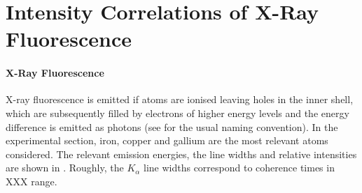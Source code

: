 


\section{Intensity Correlations of X-Ray Fluorescence}
\paragraph{X-Ray Fluorescence}
 X-ray fluorescence is emitted if atoms are ionised leaving holes in the inner shell, which are subsequently filled by electrons of higher energy levels and the energy difference is emitted as photons (see  for the usual naming convention). In the experimental section, iron, copper and gallium are the most relevant atoms considered. The relevant emission energies, the line widths and relative intensities are shown in .   Roughly, the $K_\alpha$ line widths correspond to coherence times in XXX range.
